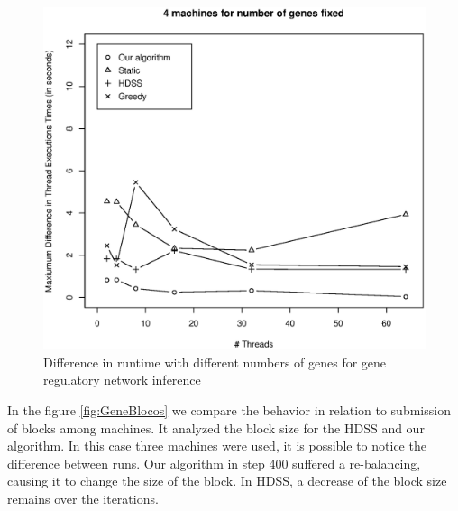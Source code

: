 \documentclass[journal]{IEEEtran}
\begin{document}
\begin{figure}[htb]
	\begin{center}
	\centering
			\includegraphics[scale=0.4]{Maxima_Diferenca_Fabrizio.eps}
	\caption{Difference in runtime with different numbers of genes for gene regulatory network inference}
	\label{fig:GeneDiferenca}
	\end{center}
\end{figure}

In the figure \ref{fig:GeneBlocos} we compare the behavior in relation to submission of blocks among machines. It analyzed the block size for the HDSS and our algorithm. In this case three machines were used, it is possible to notice the difference between runs. Our algorithm in step 400 suffered a re-balancing, causing it to change the size of the block. In HDSS, a decrease of the block size remains over the iterations.
\end{document}
